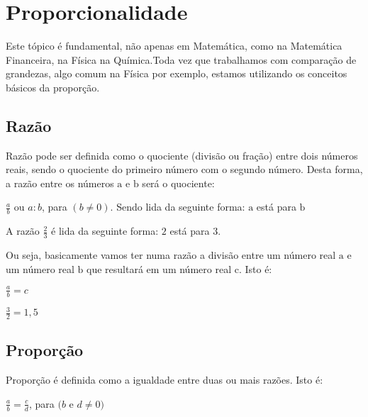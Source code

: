 \chapter{Proporcionalidade}
Este tópico é fundamental, não apenas em Matemática, como na Matemática Financeira, na Física  na Química.Toda vez que trabalhamos com comparação de grandezas, algo comum na Física por exemplo, estamos utilizando os conceitos básicos da proporção.   

\section{Razão}

\begin{definition}
    Razão pode ser definida como o quociente (divisão ou fração) entre dois números reais, sendo o quociente do primeiro número com o segundo número. Desta forma, a razão entre os números $\mathrm{a}$ e $\mathrm{b}$ será o quociente:
\end{definition}

	
	\begin{center}
		$\frac{a}{b}$ ou $a:b$, para $(b \neq 0)$. 	Sendo lida da seguinte forma: 
		$\mathrm{a}$ está para $\mathrm{b}$
	\end{center}


	\begin{example}
	A razão $\frac{2}{3}$ é lida da seguinte forma: $2$ está para $3$.
	\end{example}

Ou seja, basicamente vamos ter numa razão a divisão entre um número real $\mathrm{a}$ e um número real $\mathrm{b}$ que resultará em um número real $\mathrm{c}$. Isto é:  

	\begin{center}
		$\frac{a}{b} = c$ 
	\end{center}
	
	\begin{example}
	   $\frac{3}{2} = 1,5$
	\end{example}

\section{Proporção}

\begin{definition}
    Proporção é definida como a igualdade entre duas ou mais razões. Isto é:
\end{definition}


	\begin{center}
	    $\frac{a}{b} = \frac{c}{d}$, para $(b$ e $d \neq 0)$
	\end{center}

